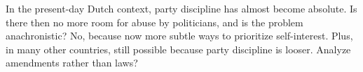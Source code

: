 In the present-day Dutch context, party discipline has almost become absolute. Is there then no more room for abuse by politicians, and is the problem anachronistic? No, because now more subtle ways to prioritize self-interest. Plus, in many other countries, still possible because party discipline is looser. Analyze amendments rather than laws?




\clearpage




